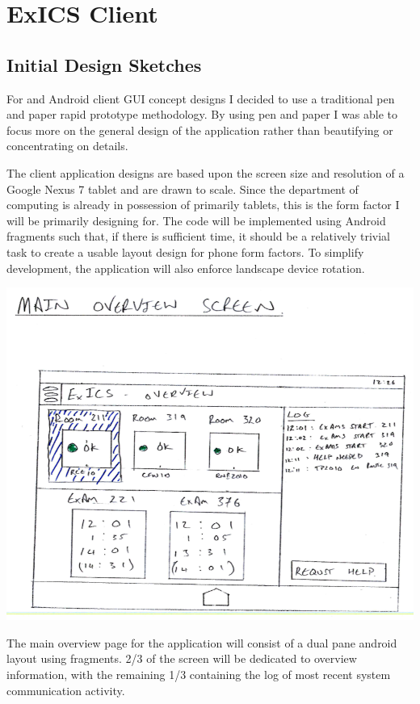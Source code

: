 \chapter{ExICS Client}

\label{ch:exicsclient}

\section{Initial Design Sketches}

For and Android client GUI concept designs I decided to use a traditional pen and paper rapid prototype methodology.  By using pen and paper I was able to focus more on the general design of the application rather than beautifying or concentrating on details.

The client application designs are based upon the screen size and resolution of a Google Nexus 7 tablet and are drawn to scale.  Since the department of computing is already in possession of primarily tablets, this is the form factor I will be primarily designing for.  The code will be implemented using Android fragments\cite{fragments} such that, if there is sufficient time, it should be a relatively trivial task to create a usable layout design for phone form factors.  To simplify development, the application will also enforce landscape device rotation.

\includegraphics[width=\textwidth]{"GUI Sketches/Main Overview Cropped"}

The main overview page for the application will consist of a dual pane android layout using fragments.  2/3 of the screen will be dedicated to overview information, with the remaining 1/3 containing the log of most recent system communication activity.

